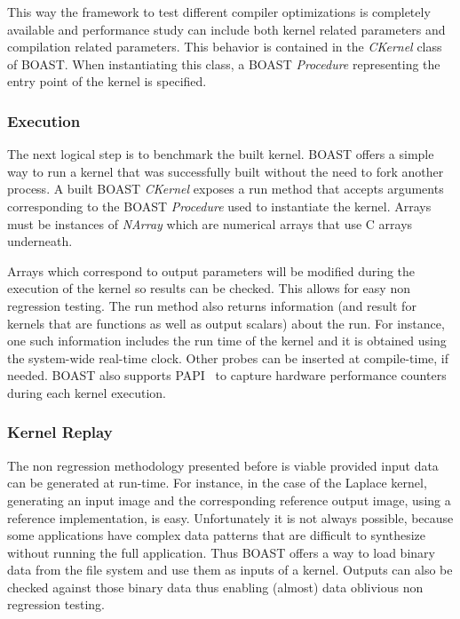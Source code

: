 \documentclass{IEEEtran}
\begin{document}
This way the framework to test different compiler optimizations is completely
available and performance study can include both kernel related parameters and
compilation related parameters. This behavior is contained in the
\emph{CKernel} class of BOAST. When instantiating this class, a BOAST
\emph{Procedure} representing the entry point of the kernel is specified.

  \subsubsection{Execution}

The next logical step is to benchmark the built kernel. BOAST offers a simple
way to run a kernel that was successfully built without the need to fork
another process.  A built BOAST \emph{CKernel} exposes a run method that
accepts arguments corresponding to the BOAST \emph{Procedure} used to
instantiate the kernel. Arrays must be instances of \emph{NArray} which are
numerical arrays that use C arrays underneath.

Arrays which correspond to output parameters will be modified during the
execution of the kernel so results can be checked. This allows for easy non
regression testing. The run method also returns information (and result for
kernels that are functions as well as output scalars) about the run. For
instance, one such information includes the run time of the kernel and it is
obtained using the system-wide real-time clock. Other probes can be inserted at
compile-time, if needed.  BOAST also supports PAPI~\cite{mucci1999papi} to
capture hardware performance counters during each kernel execution.

  \subsubsection{Kernel Replay}

The non regression methodology presented before is viable provided input data
can be generated at run-time. For instance, in the case of the Laplace kernel,
generating an input image and the corresponding reference output image, using a
reference implementation, is easy. Unfortunately it is not always possible,
because some applications have complex data patterns that are difficult to
synthesize without running the full application. Thus BOAST offers a way to load
binary data from the file system and use them as inputs of a kernel. Outputs can
also be checked against those binary data thus enabling (almost) data oblivious
non regression testing.
\end{document}
